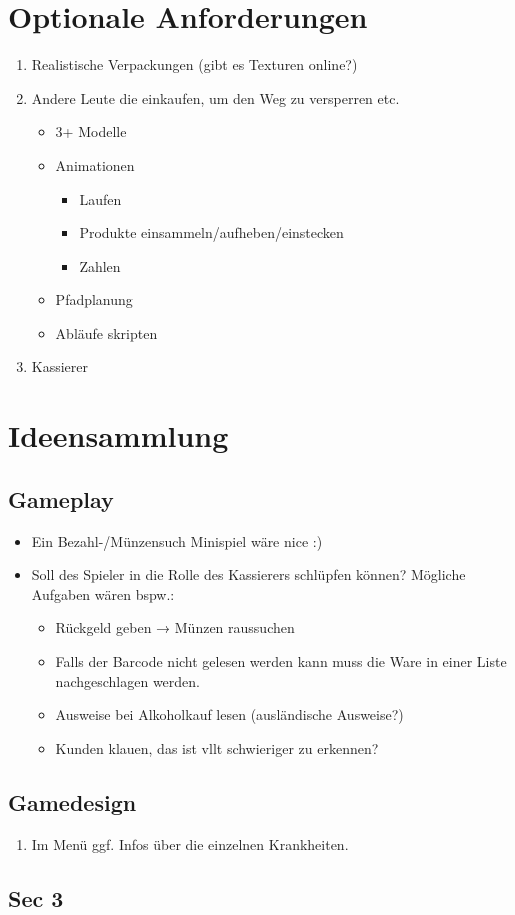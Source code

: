 ﻿\documentclass[a4paper, 11pt]{scrartcl}
\begin{document}
\section{Optionale Anforderungen}
\begin{enumerate}
    \item Realistische Verpackungen (gibt es Texturen online?)
    \item Andere Leute die einkaufen, um den Weg zu versperren etc.
    \begin{itemize}
        \item 3+ Modelle
        \item Animationen
        \begin{itemize}
            \item Laufen
            \item Produkte einsammeln/aufheben/einstecken
            \item Zahlen
        \end{itemize}
        \item Pfadplanung
        \item Abläufe skripten
    \end{itemize}
    \item Kassierer
\end{enumerate}



\section{Ideensammlung}
\subsection{Gameplay}
\begin{itemize}
    \item Ein Bezahl-/Münzensuch Minispiel wäre nice :)
    \item Soll des Spieler in die Rolle des Kassierers schlüpfen können?
    Mögliche Aufgaben wären bspw.:
    \begin{itemize}
        \item Rückgeld geben → Münzen raussuchen
        \item Falls der Barcode nicht gelesen werden kann muss die Ware
        in einer Liste nachgeschlagen werden.
        \item Ausweise bei Alkoholkauf lesen (ausländische Ausweise?)
        \item Kunden klauen, das ist vllt schwieriger zu erkennen?
    \end{itemize}
\end{itemize}

\subsection{Gamedesign}
\begin{enumerate}
    \item Im Menü ggf. Infos über die einzelnen Krankheiten.
\end{enumerate}


\subsection{Sec 3}
\end{document}
